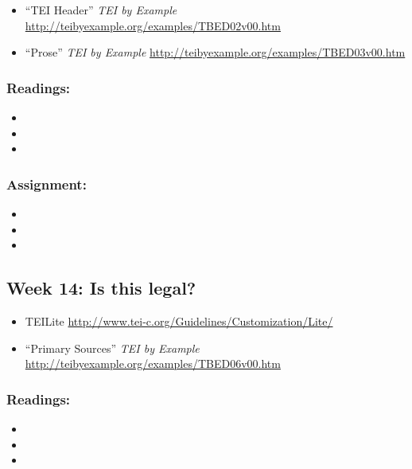 \documentclass[]{article}
\begin{document}
\begin{itemize}
\itemsep1pt\parskip0pt
\item
  ``TEI Header'' \emph{TEI by Example}
  \url{http://teibyexample.org/examples/TBED02v00.htm}
\item
  ``Prose'' \emph{TEI by Example}
  \url{http://teibyexample.org/examples/TBED03v00.htm}
\end{itemize}

\subsubsection{Readings:}\label{readings-11}

\begin{itemize}
\item
\item
\item
\end{itemize}

\subsubsection{Assignment:}\label{assignment-11}

\begin{itemize}
\item
\item
\item
\end{itemize}

\subsection{Week 14: Is this legal?}\label{week-14-is-this-legal}

\begin{itemize}
\itemsep1pt\parskip0pt
\item
  TEILite \url{http://www.tei-c.org/Guidelines/Customization/Lite/}
\item
  ``Primary Sources'' \emph{TEI by Example}
  \url{http://teibyexample.org/examples/TBED06v00.htm}
\end{itemize}

\subsubsection{Readings:}\label{readings-12}

\begin{itemize}
\item
\item
\item
\end{itemize}
\end{document}
